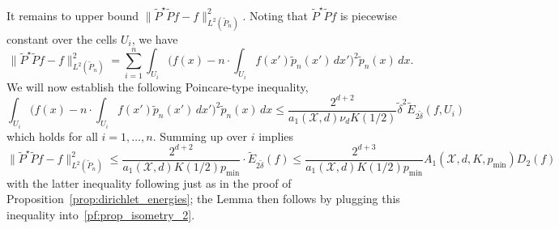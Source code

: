 \documentclass[twoside]{article}
\newcommand{\1}{\mathbf{1}}
\newcommand{\Xset}{\mathcal{X}}
\newcommand{\Leb}{L}
\newcommand{\wt}[1]{\widetilde{#1}}
\theoremstyle{definition}
\theoremstyle{remark}
\begin{document}
It remains to upper bound $\bigl\|\wt{P}^{\star}\wt{P}f - f\bigr\|_{\Leb^2(\wt{P}_n)}^2$. Noting that $\wt{P}^{\star}\wt{P}f$ is piecewise constant over the cells $U_i$, we have
\begin{equation*}
\bigl\|\wt{P}^{\star}\wt{P}f - f\bigr\|_{\Leb^2(\wt{P}_n)}^2 = \sum_{i = 1}^{n} \int_{U_i} \biggl(f(x) - n\cdot\int_{U_i} f(x') \wt{p}_n(x') \,dx'\biggr)^2 \wt{p}_n(x) \,dx.
\end{equation*}
We will now establish the following Poincare-type inequality, 
\begin{equation}
\label{pf:prop_isometry_3}
\int_{U_i} \biggl(f(x) - n\cdot\int_{U_i} f(x') \wt{p}_n(x') \,dx'\biggr)^2 \wt{p}_n(x) \,dx \leq \frac{2^{d + 2}}{a_1(\Xset,d) \nu_d K(1/2)} \wt{\delta}^2 \wt{E}_{2\wt{\delta}}(f,U_i)
\end{equation}
which holds for all $i = 1,\ldots,n$. Summing up over $i$ implies
\begin{equation*}
\bigl\|\wt{P}^{\star}\wt{P}f - f\bigr\|_{\Leb^2(\wt{P}_n)}^2 \leq \frac{2^{d+2}}{a_1(\Xset,d)K(1/2)p_{\min}} \cdot \wt{E}_{2\wt{\delta}}(f) \leq \frac{2^{d+3}}{a_1(\Xset,d)K(1/2)p_{\min}} A_1(\Xset,d,K,p_{\min}) D_2(f)
\end{equation*}
with the latter inequality following just as in the proof of Proposition~\ref{prop:dirichlet_energies}; the Lemma then follows by plugging this inequality into~\eqref{pf:prop_isometry_2}.
\end{document}
